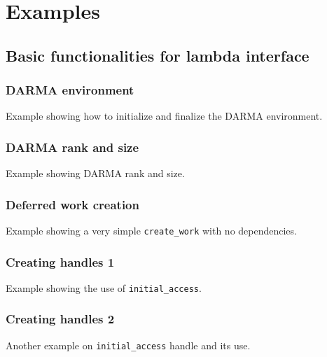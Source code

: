 
\appendix


\chapter{Examples}
\label{chap:examples}


\section{Basic functionalities for lambda interface}

\subsection{DARMA environment}
Example showing how to initialize and finalize the DARMA environment.


\subsection{DARMA rank and size}
Example showing DARMA rank and size.


\subsection{Deferred work creation}
Example showing a very simple \texttt{create\_work} with no dependencies.


\subsection{Creating handles 1}
Example showing the use of \texttt{initial\_access}.


\subsection{Creating handles 2}
Another example on \texttt{initial\_access} handle and its use.


